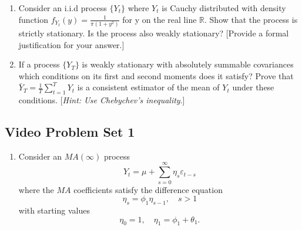 \documentclass[oneside,openany]{tufte-book} %
\begin{document}
\begin{fullwidth}
\begin{enumerate}
	\begin{enumerate}
		\item Under what conditions on $\phi_1,\phi_2$ is the AR(2) process in (1) weakly stationary.
				\vspace{6pt}
		\item  Assuming conditions in 2(a) hold, derive the mean of $Y_t$.
				\vspace{6pt}
		\item Assuming conditions in 2(a) holds, derive a second order difference equation for the autocovariance function of $Y_t$.
		
		\item  Using 2(c) derive the variance of $Y_t$ and the correlation of $Y_t$ and $Y_{t-1}$.
	\end{enumerate}
	
	
	\vspace{18pt}
	 
	\item Consider an i.i.d process $\{Y_t\}$ where $Y_t$ is Cauchy distributed with  density function $f_{Y_t}(y)= \frac{1}{\pi(1+y^2)}$ for y on the real line $\mathbb{R}$. Show that the process is strictly stationary. Is the process also weakly stationary? [Provide a formal justification for your answer.] 
	
	\vspace{18pt}
	\item If a process $\{Y_T\}$ is weakly stationary with absolutely summable covariances which conditions on its first and second moments does it satisfy? Prove that $\bar{Y}_T=\frac{1}{T} \sum_{t=1}^TY_t$ is a consistent estimator of the mean of $Y_t$ under these conditions. [\textit{Hint: Use Chebychev's inequality}.]
	


\end{enumerate}
\subsection*{Video Problem Set 1}

\begin{enumerate}
	
	\item Consider an $MA(\infty )$ process%
	\[
	Y_{t}=\mu +\sum\limits_{s=0}^{\infty }\eta _{s}\varepsilon _{t-s}
	\]%
	where the $MA$ coefficients satisfy the difference equation%
	\[
	\eta _{s}=\phi _{1}\eta _{s-1},\quad s>1
	\]%
	with starting values
	\[
	\eta _{0}=1,\quad \eta _{1}=\phi _{1}+\theta _{1}.
	\]%


\end{enumerate}
\end{fullwidth}
\end{document}
